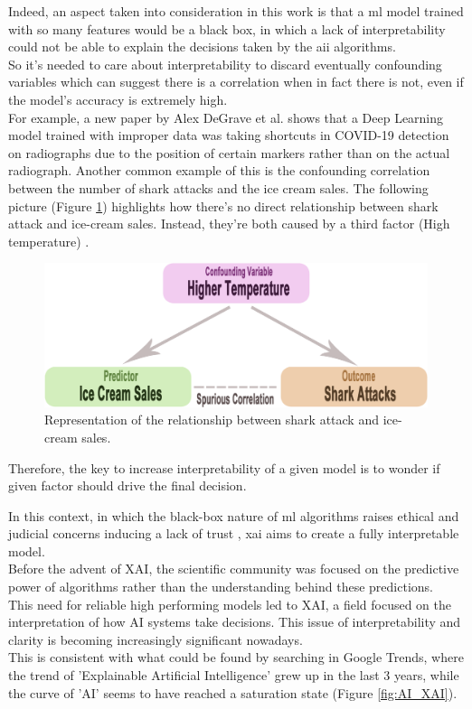 Indeed, an aspect taken into consideration in this work is that a \acrshort{ml} model trained with so many features would be a black box, in which a lack of interpretability could not be able to explain the decisions taken by the \gls{aii} algorithms.\\
So it's needed to care about interpretability to discard eventually confounding variables which can suggest there is a correlation when in fact there is not, even if the model's accuracy is extremely high.\\
For example, a new paper by Alex DeGrave et al. \cite{degrave2021ai} shows that a Deep Learning model trained with improper data was taking shortcuts in COVID-19 detection on radiographs due to the position of certain markers rather than on the actual radiograph.
Another common example of this is the confounding correlation between the number of shark attacks and the ice cream sales. 
The following picture (Figure \ref{fig:shark}) \cite{shark-icecream} highlights how there's no direct relationship between shark attack and ice-cream sales. Instead, they're both caused by a third factor (High temperature) \cite{siegel2019ice}.\newline
\begin{figure}[H]
    \centering
    \includegraphics[scale=0.25]{images/confounding.png}
    \caption{Representation of the relationship between shark attack and ice-cream sales.}
    \label{fig:shark}
\end{figure}
Therefore, the key to increase interpretability of a given model is to wonder if given factor should drive the final decision.\par
In this context, in which the black-box nature of \acrshort{ml} algorithms raises ethical and judicial concerns inducing a lack of trust \cite{9141213}, \gls{xai} aims to create a fully interpretable model.\\
Before the advent of XAI, the scientific community was focused on the predictive power of algorithms rather than the understanding behind these predictions.\\
This need for reliable high performing models led to XAI, a field focused on the interpretation of how AI systems take decisions.
This issue of interpretability and clarity is becoming increasingly significant nowadays. \\
This is consistent with what could be found by searching in Google Trends, where the trend of 'Explainable Artificial Intelligence' grew up in the last 3 years, while the curve of 'AI' seems to have reached a saturation state (Figure \ref{fig:AI_XAI}).\\

